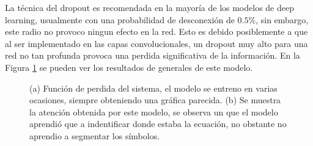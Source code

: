 La técnica del dropout es recomendada en la mayoría de los modelos de deep learning, usualmente con una probabilidad de desconexión de $0.5\%$, sin embargo, este radio no provoco ningun efecto en la red. Esto es debido posiblemente a que al ser implementado en las capas convolucionales, un dropout muy alto para una red no tan profunda provoca una perdida significativa de la información. En la Figura \ref{fig:dropout-bad} se pueden ver los resultados de generales de este modelo.



\begin{figure}[H]
    \centering
    \caption{(a) Función de perdida del sistema, el modelo se entreno en varias ocasiones, siempre obteniendo una gráfica parecida. (b) Se muestra la atención obtenida por este modelo, se observa un que el modelo aprendió que a indentificar donde estaba la ecuación, no obstante no aprendio a segmentar los símbolos.}
    \label{fig:dropout-bad}
\end{figure}

 







